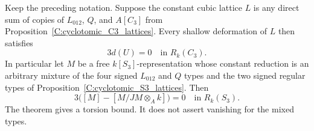 \begin{theorem}
\label{C:shallow-full-support-three-torsion}
Keep the preceding notation.  Suppose the constant cubic
lattice $L$ is any direct sum of copies of $L_{012}$, $Q$,
and $A[C_3]$ from
Proposition~\ref{C:cyclotomic_C3_lattices}.
Every shallow deformation of $L$ then satisfies
\[
                         3d(U)=0
                         \quad\text{in }R_k(C_3).       \tag{C.1.MT2}
\]
In particular let $M$ be a free $k[S_3]$-representation whose
constant reduction is an arbitrary mixture of the four
signed $L_{012}$ and $Q$ types and the two signed regular
types of Proposition~\ref{C:cyclotomic_S3_lattices}.
Then
\[
 3\bigl([M]-[M/JM\otimes_Ak]\bigr)=0
                         \quad\text{in }R_k(S_3).       \tag{C.1.MT3}
\]
The theorem gives a torsion bound.  It does not assert
vanishing for the mixed types.
\end{theorem}
